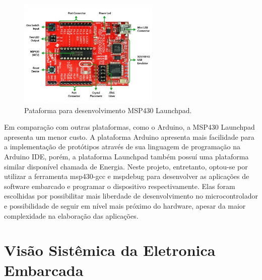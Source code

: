\begin{figure}[h]
  \centering
  \includegraphics[width=0.6\textwidth]
      {figuras/Launchpad.jpg}
  \caption{Pataforma para desenvolvimento MSP430 Launchpad.}
  \label{Launchpad}
\end{figure}
Em comparação com outras plataformas, como o Arduino, a MSP430 Launchpad apresenta um menor custo. A plataforma Arduino apresenta mais facilidade para a implementação de protótipos através de sua linguagem de programação na Arduino IDE, porém, a plataforma Launchpad também possuí uma plataforma similar disponível chamada de Energia. Neste projeto, entretanto, optou-se por utilizar a ferramenta msp430-gcc e mspdebug para desenvolver as aplicações de software embarcado e programar o dispositivo respectivamente. Elas foram escolhidas por possibilitar mais liberdade de desenvolvimento no microcontrolador e possibilidade de seguir em nível mais próximo do hardware, apesar da maior complexidade na elaboração das aplicações.





\section{Visão Sistêmica da Eletronica Embarcada} %
\label{sec:visao_sistemica}


